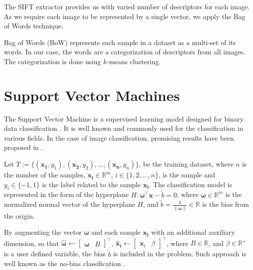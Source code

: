 \documentclass{aip-cp}
\newcommand{\norm}[1]{\left\lVert#1\right\rVert}
\begin{document}
The SIFT extractor provides us with varied number of descriptors for each image. As we require each image to be represented by a single vector, we apply the Bag of Words technique.

Bag of Words (BoW) represents each sample in a dataset as a multi-set of its words. In our case, the words are a categorization of descriptors from all images. The categorization is done using $k$-means clustering.

\section{Support Vector Machines}
The Support Vector Machine is a supervised learning model designed for binary data classification \cite{boser1992}. It is well known and commonly used for the classification in various fields. In the case of image classification, promising results have been proposed in \cite{dornak2020}.

Let $T := \{(\boldsymbol{x_1}, y_1),(\boldsymbol{x_2}, y_2),...,(\boldsymbol{x_n}, y_n)\}$,
be the training dataset, where $n$ is the number of the samples, $\boldsymbol{x_i} \in \mathbb{R}^m$, $i \in \{1,2,\dots,n\}$,
is the sample and $y_i \in \{-1, 1\}$ is the label related to the sample $\boldsymbol{x_i}$. The classification model is represented in the form of the hyperplane $H: \boldsymbol{\omega}^\top\boldsymbol{x}-\widetilde{b}=0$, where $\boldsymbol{\omega} \in \mathbb{R}^{m}$ is the normalized normal vector of the hyperplane $H$, and $\widetilde{b} = \frac{b}{\norm{\boldsymbol{\omega}}} \in \mathbb{R}$ is the bias from the origin.

By augmenting the vector $\boldsymbol{\omega}$ and each sample $\boldsymbol{x_i}$ with an additional auxiliary dimension, so that $\boldsymbol{\widehat{\omega}} \leftarrow \begin{bmatrix}\boldsymbol{\omega} & B \end{bmatrix}^\top$, $\boldsymbol{\widehat{x}_i} \leftarrow \begin{bmatrix}\boldsymbol{x}_i & \beta \end{bmatrix}^\top$, where $B \in \mathbb{R}$, and $\beta \in \mathbb{R}^+$ is a user defined variable, the bias $\widetilde{b}$ is included in the problem. Such approach is well known as the no-bias classification \cite{Aeta2018}.
\end{document}
